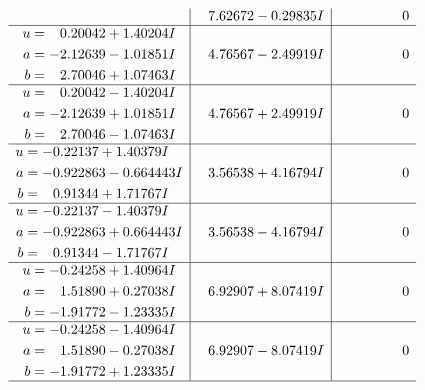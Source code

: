 \documentclass[1p]{elsarticle_modified}
\theoremstyle{definition}
\begin{document}
$$\begin{array}{c|c|c}
 & \phantom{-}7.62672 - 0.29835 I & \phantom{-0.000000 } 0 \\ \hline\begin{aligned}
u &= \phantom{-}0.20042 + 1.40204 I \\
a &= -2.12639 - 1.01851 I \\
b &= \phantom{-}2.70046 + 1.07463 I\end{aligned}
 & \phantom{-}4.76567 - 2.49919 I & \phantom{-0.000000 } 0 \\ \hline\begin{aligned}
u &= \phantom{-}0.20042 - 1.40204 I \\
a &= -2.12639 + 1.01851 I \\
b &= \phantom{-}2.70046 - 1.07463 I\end{aligned}
 & \phantom{-}4.76567 + 2.49919 I & \phantom{-0.000000 } 0 \\ \hline\begin{aligned}
u &= -0.22137 + 1.40379 I \\
a &= -0.922863 - 0.664443 I \\
b &= \phantom{-}0.91344 + 1.71767 I\end{aligned}
 & \phantom{-}3.56538 + 4.16794 I & \phantom{-0.000000 } 0 \\ \hline\begin{aligned}
u &= -0.22137 - 1.40379 I \\
a &= -0.922863 + 0.664443 I \\
b &= \phantom{-}0.91344 - 1.71767 I\end{aligned}
 & \phantom{-}3.56538 - 4.16794 I & \phantom{-0.000000 } 0 \\ \hline\begin{aligned}
u &= -0.24258 + 1.40964 I \\
a &= \phantom{-}1.51890 + 0.27038 I \\
b &= -1.91772 - 1.23335 I\end{aligned}
 & \phantom{-}6.92907 + 8.07419 I & \phantom{-0.000000 } 0 \\ \hline\begin{aligned}
u &= -0.24258 - 1.40964 I \\
a &= \phantom{-}1.51890 - 0.27038 I \\
b &= -1.91772 + 1.23335 I\end{aligned}
 & \phantom{-}6.92907 - 8.07419 I & \phantom{-0.000000 } 0\\
 \hline 
 \end{array}$$\newpage$$\begin{array}{c|c|c}  

\end{array}$$
\end{document}
